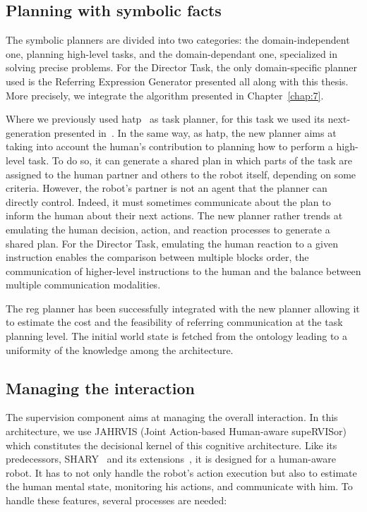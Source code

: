 \subsection{Planning with symbolic facts}

The symbolic planners are divided into two categories: the domain-independent one, planning high-level tasks, and the domain-dependant one, specialized in solving precise problems. For the Director Task, the only domain-specific planner used is the Referring Expression Generator presented all along with this thesis. More precisely, we integrate the algorithm presented in Chapter~\ref{chap:7}.

Where we previously used \acrshort{hatp}~\cite{lallement_2014_hatp} as task planner, for this task we used its next-generation presented in~\cite{buisan_2021_human}. In the same way, as \acrshort{hatp}, the new planner aims at taking into account the human's contribution to planning how to perform a high-level task. To do so, it can generate a shared plan in which parts of the task are assigned to the human partner and others to the robot itself, depending on some criteria. However, the robot's partner is not an agent that the planner can directly control. Indeed, it must sometimes communicate about the plan to inform the human about their next actions. The new planner rather trends at emulating the human decision, action, and reaction processes to generate a shared plan. For the Director Task, emulating the human reaction to a given instruction enables the comparison between multiple blocks order, the communication of higher-level instructions to the human and the balance between multiple communication modalities.

The \acrshort{reg} planner has been successfully integrated with the new planner allowing it to estimate the cost and the feasibility of referring communication at the task planning level. The initial world state is fetched from the ontology leading to a uniformity of the knowledge among the architecture.

\subsection{Managing the interaction}

The supervision component aims at managing the overall interaction. In this architecture, we use JAHRVIS (Joint Action-based Human-aware supeRVISor) which constitutes the decisional kernel of this cognitive architecture. Like its predecessors, SHARY~\cite{clodic_2009_shary} and its extensions~\cite{fiore_2016_planning, devin_2016_implemented}, it is designed for a human-aware robot. It has to not only handle the robot's action execution but also to estimate the human mental state, monitoring his actions, and communicate with him. To handle these features, several processes are needed:

